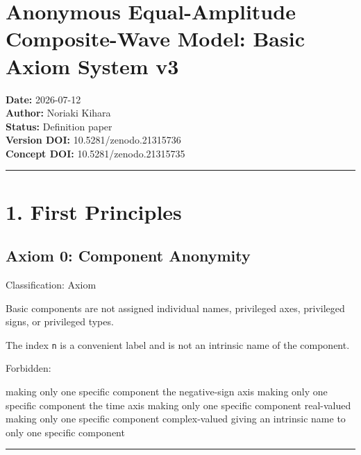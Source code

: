 \documentclass[
  a4paper]{article}
\author{}
\date{}
\newenvironment{Shaded}{}{}
\newcommand{\NormalTok}[1]{#1}
\begin{document}
\section{Anonymous Equal-Amplitude Composite-Wave Model: Basic Axiom
System
v3}\label{anonymous-equal-amplitude-composite-wave-model-basic-axiom-system-v3}

\textbf{Date:} 2026-07-12\\
\textbf{Author:} Noriaki Kihara\\
\textbf{Status:} Definition paper\\
\textbf{Version DOI:} 10.5281/zenodo.21315736\\
\textbf{Concept DOI:} 10.5281/zenodo.21315735

\begin{center}\rule{0.5\linewidth}{0.5pt}\end{center}

\section{1. First Principles}\label{first-principles}

\subsection{Axiom 0: Component
Anonymity}\label{axiom-0-component-anonymity}

Classification: Axiom

Basic components are not assigned individual names, privileged axes,
privileged signs, or privileged types.

The index \texttt{n} is a convenient label and is not an intrinsic name
of the component.

Forbidden:

\begin{Shaded}
\begin{Highlighting}[]
\NormalTok{making only one specific component the negative{-}sign axis}
\NormalTok{making only one specific component the time axis}
\NormalTok{making only one specific component real{-}valued}
\NormalTok{making only one specific component complex{-}valued}
\NormalTok{giving an intrinsic name to only one specific component}
\end{Highlighting}
\end{Shaded}

\begin{center}\rule{0.5\linewidth}{0.5pt}\end{center}
\end{document}
